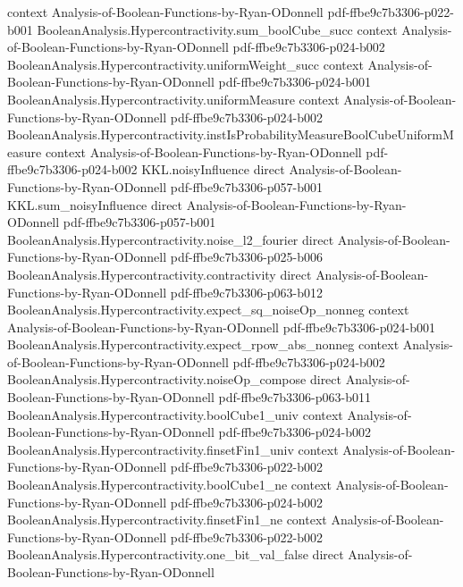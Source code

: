\begin{theorem}
  {context}
  {Analysis-of-Boolean-Functions-by-Ryan-ODonnell}
  {pdf-ffbe9c7b3306-p022-b001}
\proofstep
  {BooleanAnalysis.Hypercontractivity.sum_boolCube_succ}
  {context}
  {Analysis-of-Boolean-Functions-by-Ryan-ODonnell}
  {pdf-ffbe9c7b3306-p024-b002}
\proofstep
  {BooleanAnalysis.Hypercontractivity.uniformWeight_succ}
  {context}
  {Analysis-of-Boolean-Functions-by-Ryan-ODonnell}
  {pdf-ffbe9c7b3306-p024-b001}
\proofstep
  {BooleanAnalysis.Hypercontractivity.uniformMeasure}
  {context}
  {Analysis-of-Boolean-Functions-by-Ryan-ODonnell}
  {pdf-ffbe9c7b3306-p024-b002}
\proofstep
  {BooleanAnalysis.Hypercontractivity.instIsProbabilityMeasureBoolCubeUniformMeasure}
  {context}
  {Analysis-of-Boolean-Functions-by-Ryan-ODonnell}
  {pdf-ffbe9c7b3306-p024-b002}
\proofstep
  {KKL.noisyInfluence}
  {direct}
  {Analysis-of-Boolean-Functions-by-Ryan-ODonnell}
  {pdf-ffbe9c7b3306-p057-b001}
\proofstep
  {KKL.sum_noisyInfluence}
  {direct}
  {Analysis-of-Boolean-Functions-by-Ryan-ODonnell}
  {pdf-ffbe9c7b3306-p057-b001}
\proofstep
  {BooleanAnalysis.Hypercontractivity.noise_l2_fourier}
  {direct}
  {Analysis-of-Boolean-Functions-by-Ryan-ODonnell}
  {pdf-ffbe9c7b3306-p025-b006}
\proofstep
  {BooleanAnalysis.Hypercontractivity.contractivity}
  {direct}
  {Analysis-of-Boolean-Functions-by-Ryan-ODonnell}
  {pdf-ffbe9c7b3306-p063-b012}
\proofstep
  {BooleanAnalysis.Hypercontractivity.expect_sq_noiseOp_nonneg}
  {context}
  {Analysis-of-Boolean-Functions-by-Ryan-ODonnell}
  {pdf-ffbe9c7b3306-p024-b001}
\proofstep
  {BooleanAnalysis.Hypercontractivity.expect_rpow_abs_nonneg}
  {context}
  {Analysis-of-Boolean-Functions-by-Ryan-ODonnell}
  {pdf-ffbe9c7b3306-p024-b002}
\proofstep
  {BooleanAnalysis.Hypercontractivity.noiseOp_compose}
  {direct}
  {Analysis-of-Boolean-Functions-by-Ryan-ODonnell}
  {pdf-ffbe9c7b3306-p063-b011}
\proofstep
  {BooleanAnalysis.Hypercontractivity.boolCube1_univ}
  {context}
  {Analysis-of-Boolean-Functions-by-Ryan-ODonnell}
  {pdf-ffbe9c7b3306-p024-b002}
\proofstep
  {BooleanAnalysis.Hypercontractivity.finsetFin1_univ}
  {context}
  {Analysis-of-Boolean-Functions-by-Ryan-ODonnell}
  {pdf-ffbe9c7b3306-p022-b002}
\proofstep
  {BooleanAnalysis.Hypercontractivity.boolCube1_ne}
  {context}
  {Analysis-of-Boolean-Functions-by-Ryan-ODonnell}
  {pdf-ffbe9c7b3306-p024-b002}
\proofstep
  {BooleanAnalysis.Hypercontractivity.finsetFin1_ne}
  {context}
  {Analysis-of-Boolean-Functions-by-Ryan-ODonnell}
  {pdf-ffbe9c7b3306-p022-b002}
\proofstep
  {BooleanAnalysis.Hypercontractivity.one_bit_val_false}
  {direct}
  {Analysis-of-Boolean-Functions-by-Ryan-ODonnell}

\end{theorem}
